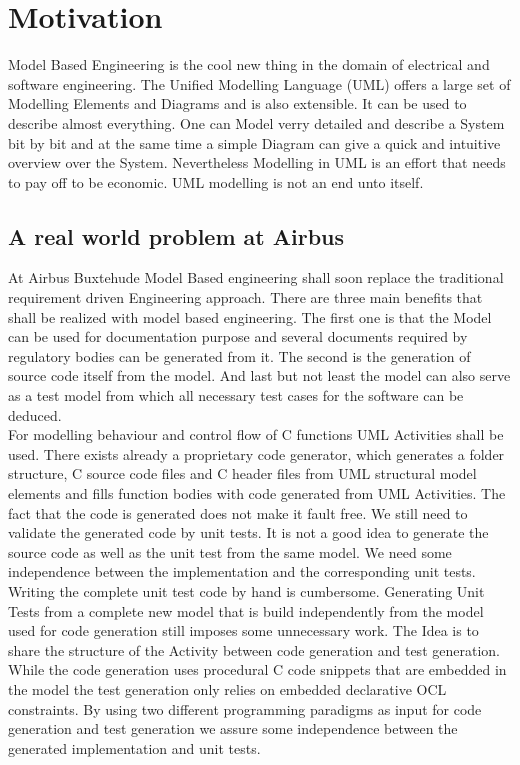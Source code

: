 \chapter{Motivation}
Model Based Engineering is the cool new thing in the domain of electrical and software engineering. The Unified Modelling Language (UML) offers a large set of Modelling Elements and Diagrams and is also extensible. It can be used to describe almost everything. One can Model verry detailed and describe a System bit by bit and at the same time a simple Diagram can give a quick and intuitive overview over the System. Nevertheless Modelling in UML is an effort that needs to pay off to be economic. UML modelling is not an end unto itself. 
\section{A real world problem at Airbus}
At Airbus Buxtehude Model Based engineering shall soon replace the traditional requirement driven Engineering approach. There are three main benefits that shall be realized with model based engineering. The first one is that the Model can be used for documentation purpose and several documents required by regulatory bodies can be generated from it. The second is the generation of source code itself from the model. And last but not least the model can also serve as a test model from which all necessary test cases for the software can be deduced.\\
For modelling behaviour and control flow of C functions UML Activities shall be used. There exists already a proprietary code generator, which generates a folder structure, C source code files and C header files from UML structural model elements and fills function bodies with code generated from UML Activities. The fact that the code is generated does not make it fault free. We still need to validate the generated code by unit tests. It is not a good idea to generate the source code as well as the unit test from the same model. We need some independence between the implementation and the corresponding unit tests. Writing the complete unit test code by hand is cumbersome. Generating Unit Tests from a complete new model that is build independently from the model used for code generation still imposes some unnecessary work. The Idea is to share the structure of the Activity between code generation and test generation. While the code generation uses procedural C code snippets that are embedded in the model the test generation only relies on embedded declarative OCL constraints. By using two different programming paradigms as input for code generation and test generation we assure some independence between the generated implementation and unit tests.
